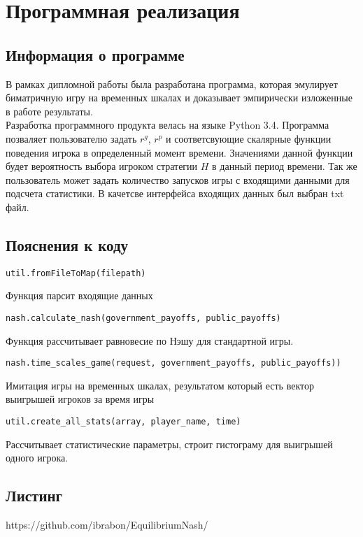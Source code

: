 \section{Программная реализация} 

\subsection{Информация о программе}
В рамках дипломной работы была разработана программа, которая эмулирует биматричную игру на временных шкалах и доказывает эмпирически изложенные в работе результаты. 
\\

Разработка программного продукта велась на языке Python 3.4.
Программа позваляет пользователю задать $r^g$, $r^p$ и соответсвующие скалярные функции поведения игрока в определенный момент времени. Значениями данной функции будет вероятность выбора игроком  стратегии $H$ в данный период времени. Так же пользователь может задать количество запусков игры с входящими данными для подсчета статистики. В качетсве интерфейса входящих данных был выбран txt файл.

\subsection{Пояснения к коду}
 \begin{lstlisting}[style=csharpinlinestyle]
	 util.fromFileToMap(filepath) 
 \end{lstlisting}
Функция парсит входящие данных

 \begin{lstlisting}[style=csharpinlinestyle]
	 nash.calculate_nash(government_payoffs, public_payoffs)
 \end{lstlisting}
 Функция рассчитывает равновесие по Нэшу для стандартной игры.
 
 
 \begin{lstlisting}[style=csharpinlinestyle]
	 nash.time_scales_game(request, government_payoffs, public_payoffs))
 \end{lstlisting}
 Имитация игры на временных шкалах, результатом который есть вектор выигрышей игроков за время игры
 
  \begin{lstlisting}[style=csharpinlinestyle]
	  util.create_all_stats(array, player_name, time)
  \end{lstlisting}
 Рассчитывает статистические параметры, строит гистограму для выигрышей одного игрока.
 
 \subsection{Листинг}
 https://github.com/ibrabon/EquilibriumNash/